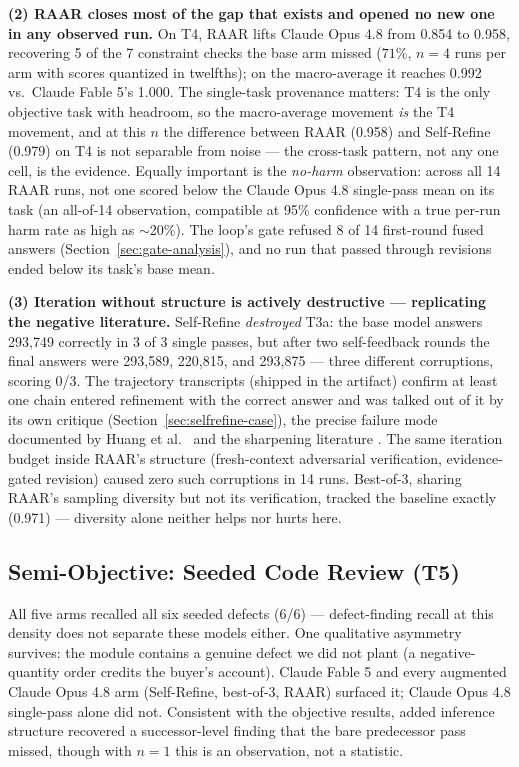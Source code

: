 \documentclass[journal]{IEEEtran}
\newcommand{\method}{RAAR}
\newcommand{\opus}{Claude Opus 4.8}
\newcommand{\fable}{Claude Fable 5}
\begin{document}
\textbf{(2) \method{} closes most of the gap that exists and opened no new
one in any observed run.} On T4, \method{} lifts \opus{} from 0.854 to
0.958, recovering 5 of the 7 constraint checks the base arm missed
($71\%$, $n{=}4$ runs per arm with scores quantized in twelfths); on the
macro-average it reaches 0.992 vs.\ \fable{}'s 1.000. The single-task
provenance matters: T4 is the only objective task with headroom, so the
macro-average movement \emph{is} the T4 movement, and at this $n$ the
difference between \method{} (0.958) and Self-Refine (0.979) on T4 is not
separable from noise --- the cross-task pattern, not any one cell, is the
evidence. Equally important is the \emph{no-harm} observation: across all
14 \method{} runs, not one scored below the \opus{} single-pass mean on
its task (an all-of-14 observation, compatible at 95\% confidence with a
true per-run harm rate as high as $\sim$20\%). The loop's gate refused 8
of 14 first-round fused answers (Section~\ref{sec:gate-analysis}), and no
run that passed through revisions ended below its task's base mean.

\textbf{(3) Iteration without structure is actively destructive ---
replicating the negative literature.} Self-Refine \emph{destroyed} T3a: the
base model answers 293{,}749 correctly in 3 of 3 single passes, but after
two self-feedback rounds the final answers were 293{,}589, 220{,}815, and
293{,}875 --- three different corruptions, scoring 0/3. The trajectory
transcripts (shipped in the artifact) confirm at least one chain entered
refinement with the correct answer and was talked out of it by its own
critique (Section~\ref{sec:selfrefine-case}), the precise failure mode
documented by Huang et al.~\cite{huang2023} and the sharpening literature
\cite{song2024}. The same iteration budget inside \method{}'s structure
(fresh-context adversarial verification, evidence-gated revision) caused
zero such corruptions in 14 runs. Best-of-3, sharing \method{}'s sampling
diversity but not its verification, tracked the baseline exactly (0.971) ---
diversity alone neither helps nor hurts here.

\subsection{Semi-Objective: Seeded Code Review (T5)}
All five arms recalled all six seeded defects (6/6) --- defect-finding
recall at this density does not separate these models either. One
qualitative asymmetry survives: the module contains a genuine defect we did
not plant (a negative-quantity order credits the buyer's account). \fable{}
and every augmented \opus{} arm (Self-Refine, best-of-3, \method{})
surfaced it; \opus{} single-pass alone did not. Consistent with the
objective results, added inference structure recovered a successor-level
finding that the bare predecessor pass missed, though with $n{=}1$ this is
an observation, not a statistic.
\end{document}
